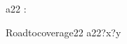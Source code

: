 \begin{circus}
\circchannel a22 : \nat \cross \nat \\
\end {circus}
\begin {circus}
\circprocess Roadtocoverage22 \circdef \circbegin
	\circspot
	    a22?x?y \then \Skip \\
	\circend
\end{circus}
